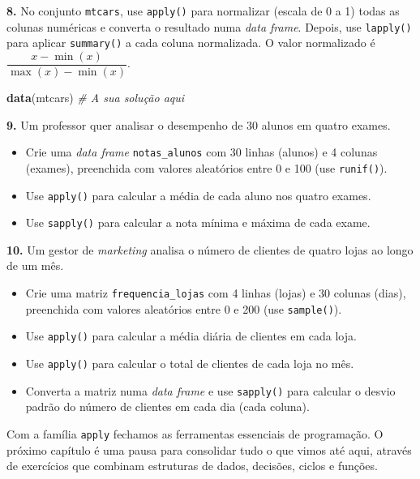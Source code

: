 \documentclass[
  portuguese,
  11pt,
  openany]{book}
\newenvironment{Shaded}{\begin{snugshade}}{\end{snugshade}}
\newcommand{\CommentTok}[1]{\textcolor[rgb]{0.56,0.35,0.01}{\textit{#1}}}
\newcommand{\FunctionTok}[1]{\textcolor[rgb]{0.13,0.29,0.53}{\textbf{#1}}}
\newcommand{\NormalTok}[1]{#1}
\providecommand{\tightlist}{%
  \setlength{\itemsep}{0pt}\setlength{\parskip}{0pt}}
\begin{document}
\textbf{8.} No conjunto \texttt{mtcars}, use \texttt{apply()} para normalizar (escala de 0 a 1) todas as
colunas numéricas e converta o resultado numa \emph{data frame}. Depois, use \texttt{lapply()}
para aplicar \texttt{summary()} a cada coluna normalizada. O valor normalizado é
\(\dfrac{x - \min(x)}{\max(x) - \min(x)}\).

\begin{Shaded}
\begin{Highlighting}[]
\FunctionTok{data}\NormalTok{(mtcars)}
\CommentTok{\# A sua solução aqui}
\end{Highlighting}
\end{Shaded}

\textbf{9.} Um professor quer analisar o desempenho de 30 alunos em quatro exames.

\begin{itemize}
\tightlist
\item
  Crie uma \emph{data frame} \texttt{notas\_alunos} com 30 linhas (alunos) e 4 colunas (exames),
  preenchida com valores aleatórios entre 0 e 100 (use \texttt{runif()}).
\item
  Use \texttt{apply()} para calcular a média de cada aluno nos quatro exames.
\item
  Use \texttt{sapply()} para calcular a nota mínima e máxima de cada exame.
\end{itemize}

\textbf{10.} Um gestor de \emph{marketing} analisa o número de clientes de quatro lojas ao longo
de um mês.

\begin{itemize}
\tightlist
\item
  Crie uma matriz \texttt{frequencia\_lojas} com 4 linhas (lojas) e 30 colunas (dias),
  preenchida com valores aleatórios entre 0 e 200 (use \texttt{sample()}).
\item
  Use \texttt{apply()} para calcular a média diária de clientes em cada loja.
\item
  Use \texttt{apply()} para calcular o total de clientes de cada loja no mês.
\item
  Converta a matriz numa \emph{data frame} e use \texttt{sapply()} para calcular o desvio padrão
  do número de clientes em cada dia (cada coluna).
\end{itemize}

Com a família \texttt{apply} fechamos as ferramentas essenciais de programação. O próximo
capítulo é uma pausa para consolidar tudo o que vimos até aqui, através de exercícios
que combinam estruturas de dados, decisões, ciclos e funções.
\end{document}
